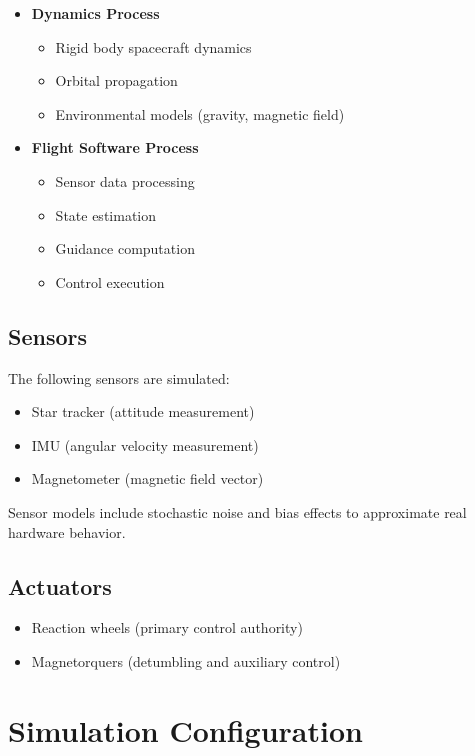 \begin{itemize}
	\item \textbf{Dynamics Process}
	\begin{itemize}
		\item Rigid body spacecraft dynamics
		\item Orbital propagation
		\item Environmental models (gravity, magnetic field)
	\end{itemize}
	
	\item \textbf{Flight Software Process}
	\begin{itemize}
		\item Sensor data processing
		\item State estimation
		\item Guidance computation
		\item Control execution
	\end{itemize}
\end{itemize}

\subsection{Sensors}

The following sensors are simulated:

\begin{itemize}
	\item Star tracker (attitude measurement)
	\item IMU (angular velocity measurement)
	\item Magnetometer (magnetic field vector)
\end{itemize}

Sensor models include stochastic noise and bias effects to approximate real hardware behavior.

\subsection{Actuators}

\begin{itemize}
	\item Reaction wheels (primary control authority)
	\item Magnetorquers (detumbling and auxiliary control)
\end{itemize}


\section{Simulation Configuration}

